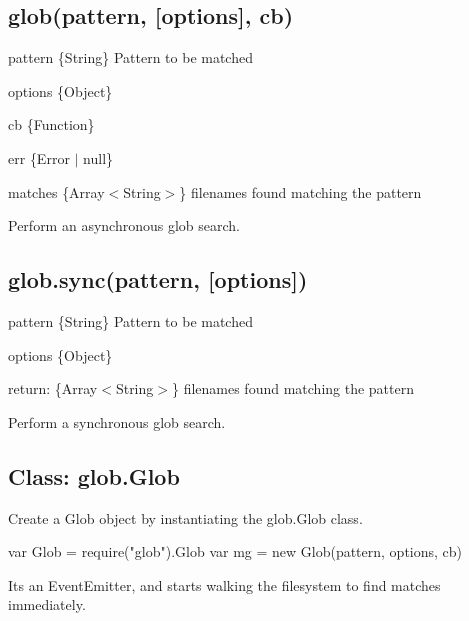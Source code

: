 \subsection*{glob(pattern, \mbox{[}options\mbox{]}, cb)}


\begin{DoxyItemize}
\item {\ttfamily pattern} {\ttfamily \{String\}} Pattern to be matched
\item {\ttfamily options} {\ttfamily \{Object\}}
\item {\ttfamily cb} {\ttfamily \{Function\}}
\begin{DoxyItemize}
\item {\ttfamily err} {\ttfamily \{Error $\vert$ null\}}
\item {\ttfamily matches} {\ttfamily \{Array$<$String$>$\}} filenames found matching the pattern
\end{DoxyItemize}
\end{DoxyItemize}

Perform an asynchronous glob search.

\subsection*{glob.\+sync(pattern, \mbox{[}options\mbox{]})}


\begin{DoxyItemize}
\item {\ttfamily pattern} {\ttfamily \{String\}} Pattern to be matched
\item {\ttfamily options} {\ttfamily \{Object\}}
\item return\+: {\ttfamily \{Array$<$String$>$\}} filenames found matching the pattern
\end{DoxyItemize}

Perform a synchronous glob search.

\subsection*{Class\+: glob.\+Glob}

Create a Glob object by instantiating the {\ttfamily glob.\+Glob} class.


\begin{DoxyCode}
var Glob = require("glob").Glob
var mg = new Glob(pattern, options, cb)
\end{DoxyCode}


It\textquotesingle{}s an Event\+Emitter, and starts walking the filesystem to find matches immediately.

